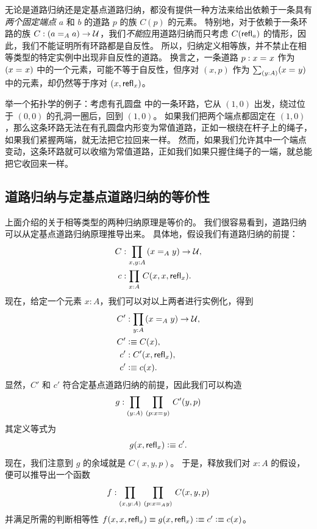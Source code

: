 \begin{rmk}
无论是道路归纳还是定基点道路归纳，都没有提供一种方法来给出依赖于一条具有\emph{两个固定端点} $a$ 和 $b$ 的道路 $p$ 的族 $C(p)$ 的元素。
特别地，对于依赖于一条环路的族 $C: (\id[A]{a}{a}) \to \UU$，我们\emph{不能}应用道路归纳而只考虑 $C(\refl{a})$ 的情形，因此，我们不能证明所有环路都是自反性。
所以，归纳定义相等族，并不禁止在相等类型的特定实例中出现非自反性的道路。
换言之，一条道路 $p:\id{x}{x}$ 作为 $(\id{x}{x})$ 中的一个元素，可能不等于自反性，但序对 $(x,p)$ 作为 $\sm{y:A}(\id{x}{y})$ 中的元素，却仍然等于序对 $(x,\refl{x})$。

举一个拓扑学的例子：考虑有孔圆盘  中的一条环路，它从 $(1,0)$ 出发，绕过位于 $(0,0)$ 的孔洞一圈后，回到 $(1,0)$。
如果我们把两个端点都固定在 $(1,0)$，那么这条环路无法在有孔圆盘内形变为常值道路，正如一根绕在杆子上的绳子，如果我们紧握两端，就无法把它拉回来一样。
然而，如果我们允许其中一个端点变动，这条环路就可以收缩为常值道路，正如我们如果只握住绳子的一端，就总能把它收回来一样。
\end{rmk}

%
%

\subsection{道路归纳与定基点道路归纳的等价性}

上面介绍的关于相等类型的两种归纳原理是等价的。
我们很容易看到，道路归纳可以从定基点道路归纳原理推导出来。
具体地，假设我们有道路归纳的前提：
\begin{align*}
C &: \prd{x,y:A}(\id[A]{x}{y}) \to \UU,\\
c &: \prd{x:A} C(x,x,\refl{x}).
\end{align*}
现在，给定一个元素 $x:A$，我们可以对以上两者进行实例化，得到
\begin{align*}
C' &: \prd{y:A} (\id[A]{x}{y}) \to \UU,  \\
C' &\defeq C(x), \\
c' &: C'(x,\refl{x}), \\
c' &\defeq c(x).
\end{align*}
显然，$C'$ 和 $c'$ 符合定基点道路归纳的前提，因此我们可以构造
\begin{equation*}
  g : \prd{y:A}{p : \id{x}{y}} C'(y,p)
\end{equation*}
其定义等式为
\[ g(x,\refl{x}) \defeq c'.\]
现在，我们注意到 $g$ 的余域就是 $C(x,y,p)$。
于是，释放我们对 $x:A$ 的假设，便可以推导出一个函数
\[ f : \prd{x,y:A}{p : \id[A]{x}{y}} C(x,y,p) \]
并满足所需的判断相等性 $f(x,x,\refl{x}) \judgeq g(x,\refl{x}) \defeq c' \defeq c(x)$。

